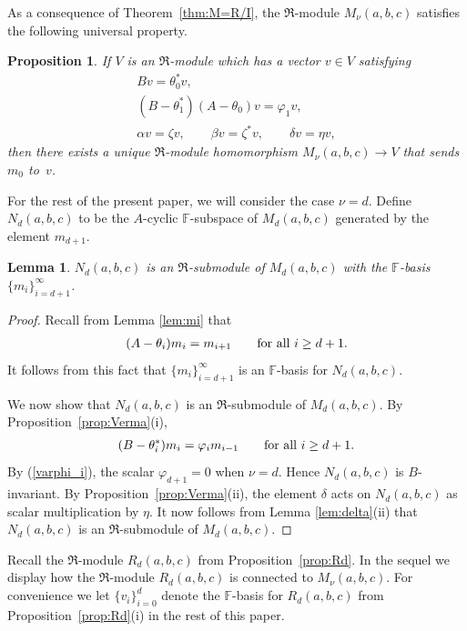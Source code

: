 \documentclass[11pt]{article}
\numberwithin{equation}{section}
\def\F{\mathbb F}
\numberwithin{equation}{section}
\newtheorem{Lemma}[Theorem]{Lemma}
\newtheorem{Proposition}[Theorem]{Proposition}
 { \theoremstyle{definition}
\newtheorem{Definition}[Theorem]{Definition}
\newtheorem{Example}[Theorem]{Example} }
\begin{document}
As a consequence of Theorem~\ref{thm:M=R/I}, the $\Re$-module $M_\nu(a,b,c)$ satisfies the following universal property.

\begin{Proposition}\label{prop:universal}If $V$ is an $\Re$-module which has a vector $v\in V$ satisfying
\begin{gather*}
Bv=\theta_0^* v,\\
(B-\theta_1^*)(A-\theta_0)v=\varphi_1 v,\\
\alpha v=\zeta v,\qquad\beta v=\zeta^* v,\qquad\delta v=\eta v,
\end{gather*}
then there exists a unique $\Re$-module homomorphism $M_\nu(a,b,c)\to V$ that sends~$m_0$ to~$v$.
\end{Proposition}

For the rest of the present paper, we will consider the case $\nu=d$. Define $N_d(a,b,c)$ to be the $A$-cyclic $\F$-subspace of $M_d(a,b,c)$ generated by the element $m_{d+1}$.

\begin{Lemma}\label{lem:N}$N_d(a,b,c)$ is an $\Re$-submodule of $M_d(a,b,c)$ with the $\F$-basis $\{m_i\}_{i=d+1}^\infty$.
\end{Lemma}
\begin{proof}Recall from Lemma \ref{lem:mi} that
\begin{gather*}
(A-\theta_i) m_i=m_{i+1}\qquad \hbox{for all $i\geq d+1$}.
\end{gather*}
It follows from this fact that $\{m_i\}_{i=d+1}^\infty$ is an $\F$-basis for $N_d(a,b,c)$.

We now show that $N_d(a,b,c)$ is an $\Re$-submodule of $M_d(a,b,c)$. By Proposition~\ref{prop:Verma}(i),
\begin{gather*}
(B-\theta_i^*)m_i=\varphi_i m_{i-1} \qquad\hbox{for all $i\geq d+1$}.
\end{gather*}
By (\ref{varphi_i}), the scalar $\varphi_{d+1}=0$ when $\nu=d$. Hence $N_d(a,b,c)$ is $B$-invariant. By Proposition~\ref{prop:Verma}(ii), the element $\delta$ acts on $N_d(a,b,c)$ as scalar multiplication by $\eta$.
It now follows from Lemma \ref{lem:delta}(ii) that
 $N_d(a,b,c)$ is an $\Re$-submodule of $M_d(a,b,c)$.
\end{proof}

Recall the $\Re$-module $R_d(a,b,c)$ from Proposition~\ref{prop:Rd}. In the sequel we display how the $\Re$-module $R_d(a,b,c)$ is connected to $M_\nu(a,b,c)$. For convenience we let $\{v_i\}_{i=0}^d$ denote the $\F$-basis for $R_d(a,b,c)$ from Proposition~\ref{prop:Rd}(i) in the rest of this paper.
\end{document}
